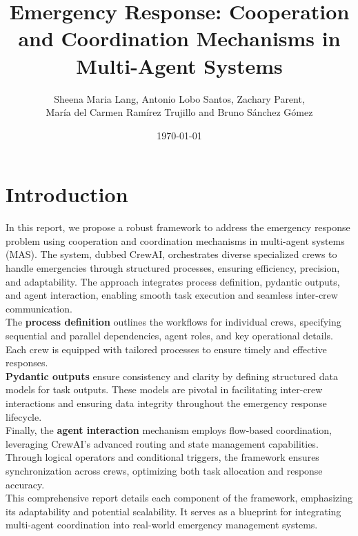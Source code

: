 \documentclass[12pt,a4paper]{article}
\title{Emergency Response: Cooperation and Coordination Mechanisms in Multi-Agent Systems}
\author{Sheena Maria Lang, Antonio Lobo Santos, Zachary Parent, \\ María del Carmen Ramírez Trujillo and Bruno Sánchez Gómez}
\date{\today}
\begin{document}
\maketitle
\tableofcontents
\newpage

\section{Introduction}
In this report, we propose a robust framework to address the emergency response problem using cooperation and coordination
 mechanisms in multi-agent systems (MAS). The system, dubbed CrewAI, orchestrates diverse specialized crews to handle emergencies
  through structured processes, ensuring efficiency, precision, and adaptability. The approach integrates process definition, 
  pydantic outputs, and agent interaction, enabling smooth task execution and seamless inter-crew communication.
\\

The \textbf{process definition} outlines the workflows for individual crews, specifying sequential and parallel dependencies, agent roles,
 and key operational details. Each crew is equipped with tailored processes to ensure timely and effective responses.
\\ 

\textbf{Pydantic outputs} ensure consistency and clarity by defining structured data models for task outputs. These models are
 pivotal in facilitating inter-crew interactions and ensuring data integrity throughout the emergency response lifecycle.
\\ 

Finally, the \textbf{agent interaction} mechanism employs flow-based coordination, leveraging CrewAI’s advanced routing and state 
management capabilities. Through logical operators and conditional triggers, the framework ensures synchronization across crews, 
optimizing both task allocation and response accuracy.
\\ 

This comprehensive report details each component of the framework, emphasizing its adaptability and potential scalability. 
It serves as a blueprint for integrating multi-agent coordination into real-world emergency management systems.
\\
\end{document}

